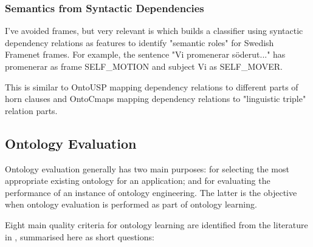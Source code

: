 \documentclass[a4paper]{report}
\newcommand{\todo}[1]{}
\begin{document}

\subsubsection{Semantics from Syntactic Dependencies}

I've avoided frames, but very relevant is \cite{JohanssonEtAl12RoleFrame} which builds a classifier using syntactic dependency relations as features to identify "semantic roles" for Swedish Framenet frames.
For example, the sentence "Vi promenerar s\"{o}derut..." has promenerar as frame SELF\_MOTION and subject Vi as SELF\_MOVER.
\todo{I should probably mention frames somewhere and explain why I've avoided it.
  One good reason is that swedish frames so far exist only for the general domain, medical domain and art domain\cite{JohanssonEtAl12RoleFrame}.}
This is similar to OntoUSP mapping dependency relations to different parts of horn clauses and OntoCmaps mapping dependency relations to "linguistic triple" relation parts.



\subsection{Ontology Evaluation}
\label{sec:background:eval}
Ontology evaluation generally has two main purposes: for selecting the most appropriate existing ontology for an application; and for evaluating the performance of an instance of ontology engineering.
The latter is the objective when ontology evaluation is performed as part of ontology learning.

Eight main quality criteria for ontology learning are identified from the literature in \cite{HOO2009OntEval}, summarised here as short questions:
\end{document}
